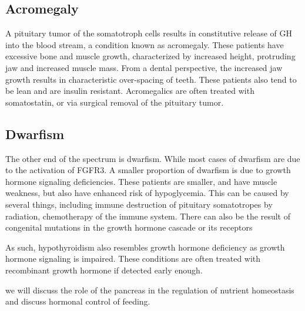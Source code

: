 \documentclass{tufte-handout}
\begin{document}
\subsection{Acromegaly}

A pituitary tumor of the somatotroph cells results in constitutive release of GH into the blood stream, a condition known as acromegaly.  These patients have excessive bone and muscle growth, characterized by increased height, protruding jaw and increased muscle mass.  From a dental perspective, the increased jaw growth results in characteristic over-spacing of teeth.  These patients also tend to be lean and are insulin resistant.  Acromegalics are often treated with somatostatin, or via surgical removal of the pituitary tumor.

\subsection{Dwarfism}

The other end of the spectrum is dwarfism.  While most cases of dwarfism are due to the activation of FGFR3\cite{Shiang1994}.  A smaller proportion of dwarfism is due to growth hormone signaling deficiencies.  These patients are smaller, and have muscle weakness, but also have enhanced risk of hypoglycemia.  This can be caused by several things, including immune destruction of pituitary somatotropes by radiation, chemotherapy of the immune system.  There can also be the result of congenital mutations in the growth hormone cascade or its receptors

  As such, hypothyroidism also resembles growth hormone deficiency as growth hormone signaling is impaired.  These conditions are often treated with recombinant growth hormone if detected early enough.

 we will discuss the role of the pancreas in the regulation of nutrient homeostasis and discuss hormonal control of feeding.
\listoffigures
\listoftables



\end{document}
